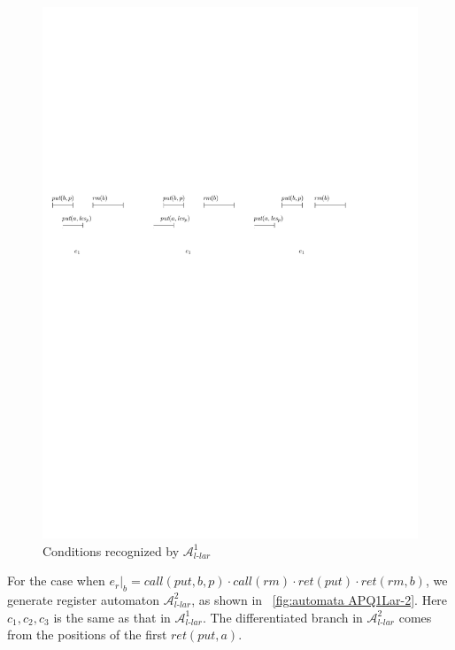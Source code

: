\begin{figure}[htbp]
  \centering
  \includegraphics[width=1 \textwidth]{figures/PIC_HIS_PQ1Lar-pprr.pdf}
  \caption{Conditions recognized by $\mathcal{A}_{\textit{l-lar}}^1$}
  \label{fig:his for APQ1Lar-1}
\end{figure}


For the case when $e_r \vert_{b} = \textit{call}(\textit{put},b,p) \cdot \textit{call}(\textit{rm}) \cdot \textit{ret}(\textit{put}) \cdot \textit{ret}(\textit{rm},b)$, we generate register automaton $\mathcal{A}_{\textit{l-lar}}^2$, as shown in \figurename~\ref{fig:automata APQ1Lar-2}. Here $c_1,c_2,c_3$ is the same as that in $\mathcal{A}_{\textit{l-lar}}^1$. The differentiated branch in $\mathcal{A}_{\textit{l-lar}}^2$ comes from the positions of the first $\textit{ret}(\textit{put},a)$.

